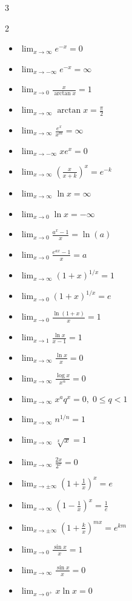 \begin{multicols*}{3}
\begin{multicols}{2}
\begin{itemize}[noitemsep, topsep=0pt, leftmargin=*]
\item $\lim_{x\to\infty}e^{-x}=0$
\item $\lim_{x\to-\infty}e^{-x}=\infty$
\item $\lim_{x\to0}\frac{x}{\arctan x}=1$
\item $\lim_{x\to\infty}\arctan x=\frac\pi2$

\item $\lim_{x\to\infty}\frac{e^x}{x^m}=\infty$
\item $\lim_{x\to-\infty}xe^x=0$
\item $\lim_{x\to\infty}\left(\frac{x}{x+k}\right)^x=e^{-k}$

\item $\lim_{x\to\infty}\ln x=\infty$
\item $\lim_{x\to0}\ln x=-\infty$
\item $\lim_{x\to0}\frac{a^x-1}{x}=\ln(a)$
\item $\lim_{x\to0}\frac{e^{ax}-1}{x}=a$

\item $\lim_{x\to\infty}(1+x)^{1/x}=1$
\item $\lim_{x\to0}(1+x)^{1/x}=e$
\item $\lim_{x\to0}\frac{\ln(1+x)}x=1$
\item $\lim_{x\to1}\frac{\ln x}{x-1}=1$

\item $\lim_{x\to\infty}\frac{\ln x}{x}=0$
\item $\lim_{x\to\infty}\frac{\log x}{x^\alpha}=0$

\item $\lim_{x\to\infty}x^aq^x=0,\;0\le q<1$
\item $\lim_{x\to\infty}n^{1/n}=1$
\item $\lim_{x\to\infty}\sqrt[x]{x}=1$
\item $\lim_{x\to\infty}\frac{2x}{2^x}=0$

\item $\lim_{x\to\pm\infty}\left(1+\frac1x\right)^x=e$
\item $\lim_{x\to\infty}\left(1-\frac1x\right)^x=\frac1e$

\item $\lim_{x\to\pm\infty}\left(1+\frac{k}{x}\right)^{mx}=e^{km}$

\item $\lim_{x\to0}\frac{\sin x}{x}=1$
\item $\lim_{x\to\infty}\frac{\sin x}{x}=0$
\item $\lim_{x\to0^+}x\ln x=0$


\end{itemize}
\end{multicols}
\end{multicols*}
